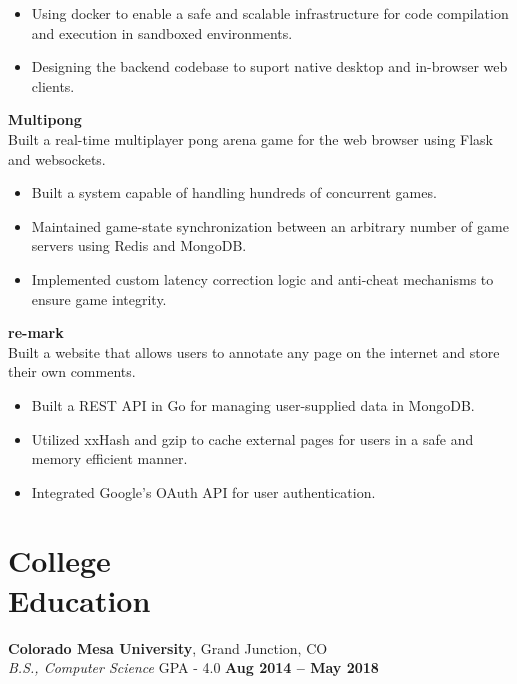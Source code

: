 \documentclass[margin,line]{resume}
\begin{document}
\begin{resume}
	\begin{itemize}
	\item Using docker to enable a safe and scalable infrastructure for code
          compilation and execution in sandboxed environments.
    \item Designing the backend codebase to suport native desktop and in-browser
          web clients.
	\end{itemize}

    \textbf{Multipong}\\
    Built a real-time multiplayer pong arena game for the web browser using Flask and
    websockets.

        \begin{itemize}
        \item Built a system capable of handling hundreds of concurrent games.
        \item Maintained game-state synchronization between an arbitrary number of
              game servers using Redis and MongoDB.
        \item Implemented custom latency correction logic and anti-cheat mechanisms
              to ensure game integrity.
	\end{itemize}


    \textbf{re-mark}\\
    Built a website that allows users to annotate any page on the internet
    and store their own comments.

        \begin{itemize}
        \item Built a REST API in Go for managing user-supplied data in MongoDB.
        \item Utilized xxHash and gzip to cache external pages for users in
              a safe and memory efficient manner.
        \item Integrated Google's OAuth API for user authentication.
        \end{itemize}

    \section{\mysidestyle College\\Education}

    \textbf{Colorado Mesa University}, Grand Junction, CO \vspace{2mm}\\\vspace{1mm}%
    \textsl{B.S., Computer Science} GPA - 4.0 \hfill \textbf{Aug 2014 -- May 2018}


\end{resume}
\end{document}
